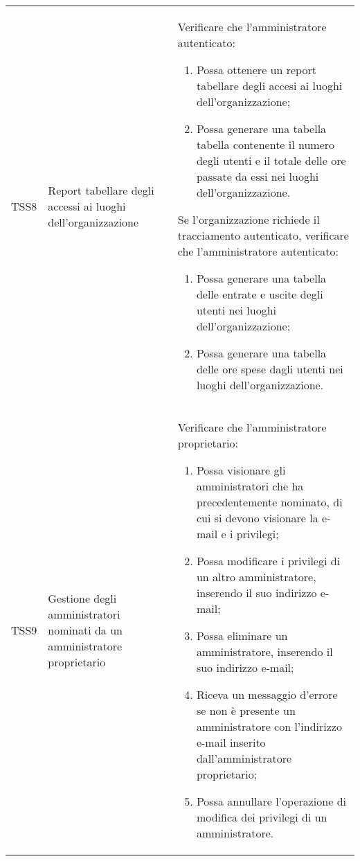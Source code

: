 {\begin{longtable}{ c  C{3cm}  C{11cm} }
TSS8 & Report tabellare degli accessi ai luoghi dell'organizzazione &
Verificare che l'amministratore autenticato:
\begin{enumerate}
    \item Possa ottenere un report tabellare degli accesi ai luoghi dell'organizzazione;
    \item Possa generare una tabella tabella contenente il numero degli utenti e il totale delle ore passate da essi nei luoghi dell’organizzazione.
\end{enumerate}
Se l'organizzazione richiede il tracciamento autenticato, verificare che l'amministratore autenticato:
\begin{enumerate}
    \item Possa generare una tabella delle entrate e uscite degli utenti nei luoghi dell'organizzazione;
    \item Possa generare una tabella delle ore spese dagli utenti nei luoghi dell'organizzazione.
\end{enumerate} \\

TSS9 & Gestione degli amministratori nominati da un amministratore proprietario & 
Verificare che l'amministratore proprietario:
\begin{enumerate}
    \item Possa visionare gli amministratori che ha precedentemente nominato, di cui si devono visionare la e-mail e i privilegi;
    \item Possa modificare i privilegi di un altro amministratore, inserendo il suo indirizzo e-mail;
    \item Possa eliminare un amministratore, inserendo il suo indirizzo e-mail; 
    \item Riceva un messaggio d'errore se non è presente un amministratore con l'indirizzo e-mail inserito dall'amministratore proprietario;
    \item Possa annullare l'operazione di modifica dei privilegi di un amministratore.
\end{enumerate} \\


\end{longtable}}
